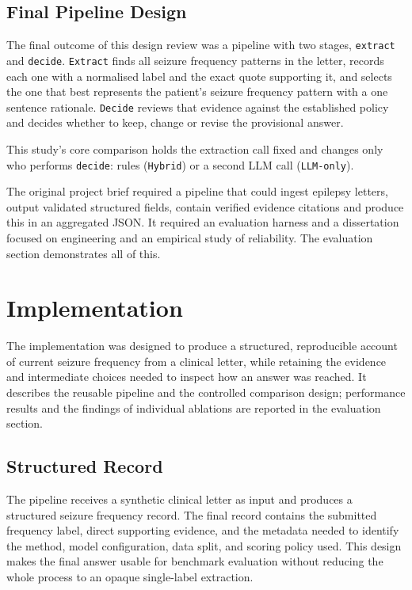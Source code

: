 \documentclass[conference]{IEEEtran}
\begin{document}
\subsection{Final Pipeline Design}

The final outcome of this design review was a 
pipeline with two stages, 
\texttt{extract} and \texttt{decide}. \texttt{Extract} 
finds all seizure frequency patterns in the letter, 
records each one with a normalised label and
the exact quote supporting it, and selects the
one that best represents the patient's seizure
frequency pattern with a one sentence rationale.
\texttt{Decide} reviews that evidence against 
the established policy and decides whether to
keep, change or revise the provisional answer.

This study's core comparison holds the extraction call 
fixed and changes only who performs \texttt{decide}: 
rules (\texttt{Hybrid}) or a second LLM call 
(\texttt{LLM-only}). 

The original project brief required a pipeline that
could ingest epilepsy letters, output validated 
structured fields, contain verified evidence citations
and produce this in an aggregated JSON. It required
an evaluation harness and a dissertation focused 
on engineering and an empirical study of reliability.
The evaluation section demonstrates all of this.

\section{Implementation}

The implementation was designed to produce a structured, 
reproducible account of current seizure frequency from 
a clinical letter, while retaining the evidence and 
intermediate choices needed to inspect how an answer 
was reached. It describes the reusable pipeline and the 
controlled comparison design; performance results and 
the findings of individual ablations are reported in the 
evaluation section.

\subsection{Structured Record}

The pipeline receives a synthetic clinical letter as input
and produces a structured seizure frequency record. The 
final record contains the submitted frequency label, direct 
supporting evidence, and the metadata needed to identify 
the method, model configuration, data split, and scoring 
policy used. This design makes the final answer usable for 
benchmark evaluation without reducing the whole process 
to an opaque single-label extraction.
\end{document}
